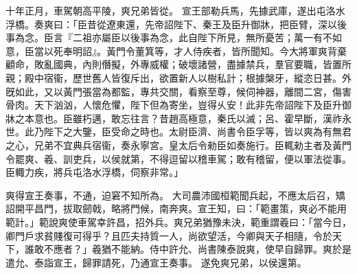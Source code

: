 \begin{pinyinscope}
十年正月，車駕朝高平陵，爽兄弟皆從。
宣王部勒兵馬，先據武庫，遂出屯洛水浮橋。奏爽曰：「臣昔從遼東還，先帝詔陛下、秦王及臣升御牀，把臣臂，深以後事為念。臣言『二祖亦屬臣以後事為念，此自陛下所見，無所憂苦；萬一有不如意，臣當以死奉明詔』。黃門令董箕等，才人侍疾者，皆所聞知。今大將軍爽背棄顧命，敗亂國典，內則僭擬，外專威權；破壞諸營，盡據禁兵，羣官要職，皆置所親；殿中宿衞，歷世舊人皆復斥出，欲置新人以樹私計；根據槃牙，縱恣日甚。外旣如此，又以黃門張當為都監，專共交關，看察至尊，候伺神器，離間二宮，傷害骨肉。天下汹汹，人懷危懼，陛下但為寄坐，豈得乆安！此非先帝詔陛下及臣升御牀之本意也。臣雖朽邁，敢忘往言？昔趙高極意，秦氏以滅；呂、霍早斷，漢祚永世。此乃陛下之大鑒，臣受命之時也。太尉臣濟、尚書令臣孚等，皆以爽為有無君之心，兄弟不宜典兵宿衞，奏永寧宮。皇太后令勑臣如奏施行。臣輒勑主者及黃門令罷爽、羲、訓吏兵，以侯就第，不得逗留以稽車駕；敢有稽留，便以軍法從事。臣輙力疾，將兵屯洛水浮橋，伺察非常。」


爽得宣王奏事，不通，迫窘不知所為。
大司農沛國桓範聞兵起，不應太后召，矯詔開平昌門，拔取劒戟，略將門候，南奔爽。宣王知，曰：「範畫策，爽必不能用範計。」範說爽使車駕幸許昌，招外兵。爽兄弟猶豫未決，範重謂羲曰：「當今日，卿門戶求貧賤復可得乎？且匹夫持質一人，尚欲望活，今卿與天子相隨，令於天下，誰敢不應者？」羲猶不能納。侍中許允、尚書陳泰說爽，使早自歸罪。爽於是遣允、泰詣宣王，歸罪請死，乃通宣王奏事。
遂免爽兄弟，以侯還第。



\end{pinyinscope}

